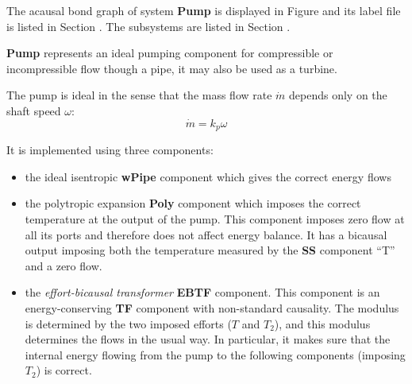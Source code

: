 

   The acausal bond graph of system \textbf{Pump} is
   displayed in Figure  and its label
   file is listed in Section .
   The subsystems are listed in Section .

\textbf{Pump} represents an ideal pumping component for compressible
or incompressible flow though a pipe, it may also be used as a turbine.

The pump is ideal in the sense that the mass flow rate $\dot m$
depends only on the shaft speed $\omega$:
\begin{equation}
  \dot m = k_p \omega
\end{equation}

It is implemented using three components:
\begin{itemize}
\item the ideal isentropic \textbf{wPipe} component which gives the
  correct energy flows
\item the polytropic expansion \textbf{Poly} component which imposes
  the correct temperature at the output of the pump. This component
  imposes zero flow at all its ports and therefore does not affect
  energy balance. It has a bicausal output imposing both the
  temperature measured by the \textbf{SS} component ``T'' and a zero
  flow.
\item the \emph{effort-bicausal transformer} \textbf{EBTF}
  component. This component is an energy-conserving \textbf{TF}
  component with non-standard causality. The modulus is determined by
  the two imposed efforts ($T$ and $T_2$), and this modulus determines
  the flows in the usual way. In particular, it makes sure that the
  internal energy flowing from the pump to the following components
  (imposing $T_2$) is correct.
\end{itemize}
